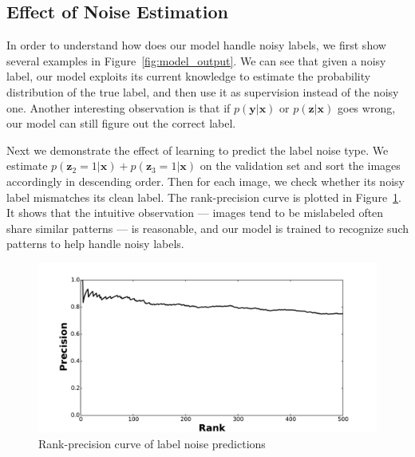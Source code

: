 \documentclass[10pt,twocolumn,letterpaper]{article}
\def\vec{\mathbf}
\begin{document}
\subsection{Effect of Noise Estimation} %
\label{sub:effect_of_noise_estimation}
In order to understand how does our model handle noisy labels, we first show several examples in Figure~\ref{fig:model_output}. We can see that given a noisy label, our model exploits its current knowledge to estimate the probability distribution of the true label, and then use it as supervision instead of the noisy one. Another interesting observation is that if $p(\vec{y}|\vec{x})$ or $p(\vec{z}|\vec{x})$ goes wrong, our model can still figure out the correct label.

Next we demonstrate the effect of learning to predict the label noise type. We estimate $p(\vec{z}_2=1|\vec{x})+p(\vec{z}_3=1|\vec{x})$ on the validation set and sort the images accordingly in descending order. Then for each image, we check whether its noisy label mismatches its clean label. The rank-precision curve is plotted in Figure~\ref{fig:noise_prediction_rp}. It shows that the intuitive observation --- images tend to be mislabeled often share similar patterns --- is reasonable, and our model is trained to recognize such patterns to help handle noisy labels.

\begin{figure}[t]
\begin{center}
\includegraphics[width=1.0\linewidth]{figure/noise_prediction_rank_precision.pdf}
\end{center}
\caption{Rank-precision curve of label noise predictions}
\label{fig:noise_prediction_rp}
\end{figure}
\end{document}
